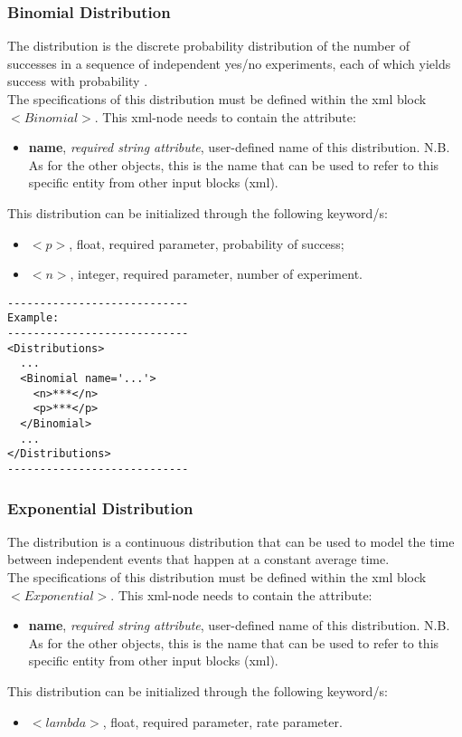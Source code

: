 \subsubsection{Binomial Distribution}
\label{subsubsec:Binomial}
The  distribution is the discrete probability distribution of the number of successes in a sequence of  independent yes/no experiments, each of which yields success with probability . 
\\ The specifications of this distribution must be defined within the xml block $<Binomial>$. This xml-node needs to contain the attribute:
\vspace{-5mm}
\begin{itemize}
\itemsep0em
\item \textbf{name}, \textit{required string attribute}, user-defined name of this distribution. N.B. As for the other objects, this is the name that can be used to refer to this specific entity from other input blocks (xml).   
\end{itemize}
\vspace{-5mm}
This distribution can be initialized through the following keyword/s:
\begin{itemize}
\item $<p>$, float, required parameter,  probability of success;
\item $<n>$, integer, required parameter, number of experiment.
\end{itemize}

\begin{lstlisting}[style=XML]
----------------------------
Example:
----------------------------
<Distributions>
  ...
  <Binomial name='...'>
    <n>***</n>
    <p>***</p>
  </Binomial>
  ...
</Distributions>
----------------------------
\end{lstlisting}

\subsubsection{Exponential Distribution}
\label{subsubsec:Exponential}
The  distribution is a continuous distribution that can be used to model the time between independent events that
happen at a constant average time. 
\\ The specifications of this distribution must be defined within the xml block $<Exponential>$. This xml-node needs to contain the attribute:
\vspace{-5mm}
\begin{itemize}
\itemsep0em
\item \textbf{name}, \textit{required string attribute}, user-defined name of this distribution. N.B. As for the other objects, this is the name that can be used to refer to this specific entity from other input blocks (xml).   
\end{itemize}
\vspace{-5mm}
This distribution can be initialized through the following keyword/s:
\begin{itemize}
\item $<lambda>$, float, required parameter,  rate parameter.
\end{itemize}

